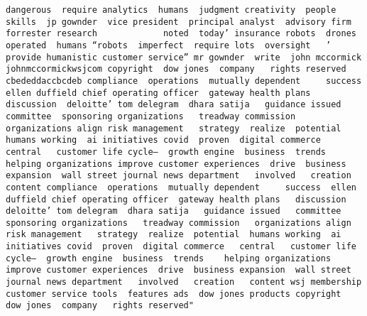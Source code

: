 \documentclass[
]{article}
\begin{document}
\begin{verbatim}
dangerous  require analytics  humans  judgment creativity  people skills  jp gownder  vice president  principal analyst  advisory firm                       forrester research             noted  today’ insurance robots  drones    operated  humans “robots  imperfect  require lots  oversight   ’ provide humanistic customer service” mr gownder  write  john mccormick  johnmccormickwsjcom copyright  dow jones  company   rights reserved cbededdaccbcdeb compliance  operations  mutually dependent     success  ellen duffield chief operating officer  gateway health plans   discussion  deloitte’ tom delegram  dhara satija   guidance issued   committee  sponsoring organizations   treadway commission   organizations align risk management   strategy  realize  potential  humans working  ai initiatives covid  proven  digital commerce   central   customer life cycle—  growth engine  business  trends    helping organizations improve customer experiences  drive  business expansion  wall street journal news department   involved   creation   content compliance  operations  mutually dependent     success  ellen duffield chief operating officer  gateway health plans   discussion  deloitte’ tom delegram  dhara satija   guidance issued   committee  sponsoring organizations   treadway commission   organizations align risk management   strategy  realize  potential  humans working  ai initiatives covid  proven  digital commerce   central   customer life cycle—  growth engine  business  trends    helping organizations improve customer experiences  drive  business expansion  wall street journal news department   involved   creation   content wsj membership customer service tools  features ads  dow jones products copyright   dow jones  company   rights reserved"                                                                                                                                                                                                                                                                                                                                                                                                                                                                                                                                                                                                                                                                                                                                                                                                                                                                                                                                                                                                                                                                                                                                                                                                                                                                                                                                                                                                                                                                                                                                                                                                                     
\end{verbatim}
\end{document}
